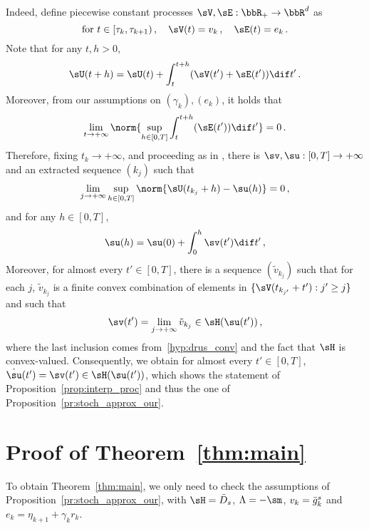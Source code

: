  Indeed, define piecewise constant processes $\sV, \sE : \bbR_{+} \rightarrow \bbR^d$ as
 \begin{equation*}
 \textrm{for $t \in [\tau_k, \tau_{k+1})$}\, , \quad  \sV(t) = v_k\, ,  \quad \sE(t) = e_{k}\, .
 \end{equation*}
Note that for any $t, h>0$,
 \begin{equation*}
  \sU(t+h) = \sU(t) + \int_{t}^{t+h} (\sV(t')+\sE(t')) \dif t'\, . 
 \end{equation*}
Moreover, from our assumptions on $(\gamma_k), (e_k)$, it holds that
\begin{equation*}
 \lim_{t \rightarrow + \infty} \norm{\sup_{h \in [0,T]} \int_{t}^{t+h} (\sE(t')) \dif t'} = 0 \, .
\end{equation*}
 Therefore, fixing $t_{k} \rightarrow + \infty$, and proceeding as in \cite[Proof of Theorem 4.2]{benaim_05_DI_1}, there is $\sv, \su : [0, T] \rightarrow + \infty$ and an extracted sequence $(k_j)$ such that
 \begin{equation*}
 \lim_{j \rightarrow + \infty} \sup_{h \in [0,T]}\norm{\sU(t_{k_j} + h) - \su(h)} = 0 \, ,
 \end{equation*}
 and for any $h \in [0,T]$,
 \begin{equation*}
  \su(h) = \su(0) + \int_{0}^h \sv(t') \dif t'\, ,
 \end{equation*}
 Moreover, for almost every $t' \in[0,T]$, there is a sequence $(\tilde{v}_{k_j})$ such that for each $j$, $\tilde{v}_{k_j}$ is a finite convex combination of elements in $\{\sV(t_{k_{j'}} + t'): j' \geq j \}$ and such that
\begin{equation*}
  \sv(t') = \lim_{j \rightarrow + \infty} \tilde{v}_{k_j} \in \sH(\su(t'))\, ,
\end{equation*}
where the last inclusion comes from~\eqref{hyp:drus_conv} and the fact that $\sH$ is convex-valued.
Consequently, we obtain for almost every $t' \in [0,T]$, $\dot{\su}(t') = \sv(t')\in  \sH(\su(t'))$, which shows the statement of Proposition~\ref{prop:interp_proc} and thus the one of Proposition~\ref{pr:stoch_approx_our}.


\section{Proof of Theorem~\ref{thm:main}}\label{pf:main_th}
To obtain Theorem~\ref{thm:main}, we only need to check the assumptions of Proposition~\ref{pr:stoch_approx_our}, with $\sH = \bar{D}_s$, $\Lambda = -\sm$, $v_k = \bar{g}_k^s$ and $e_k = \eta_{k+1} + \gamma_k r_k$.


